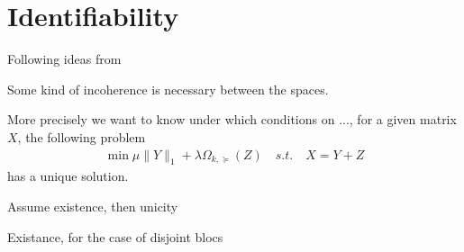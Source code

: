 \section{Identifiability}
\label{sec:id}

Following ideas from \citet{chandrasekaran2011rank}


Some kind of incoherence is necessary between the spaces.

More precisely we want to know under which conditions on ..., for a given matrix $X$, the following problem 
\begin{align}
\min \mu\|Y\|_1+\lambda\Omega_{k,\succeq}(Z) \quad s.t. \quad X=Y+Z
\end{align}
has a unique solution.

\begin{thm} Assume existence, then unicity
\end{thm}

\begin{thm} Existance, for the case of disjoint blocs 
\end{thm}